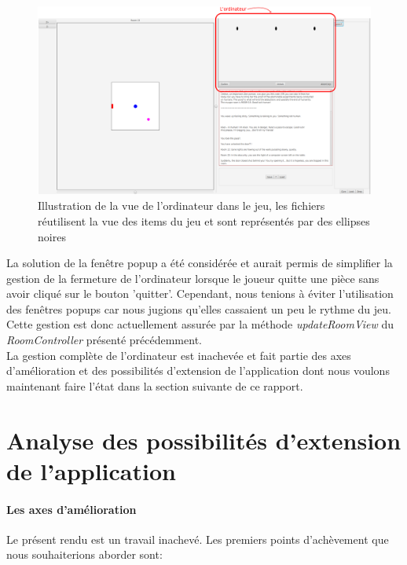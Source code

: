 \documentclass[./standalone.tex]{subfiles}
\begin{document}
\begin{center}
	\begin{figure}[h!]
	\advance\leftskip-0.6cm
	\includegraphics[scale=0.25]{images/ordinateur.png}
	\caption{Illustration de la vue de l'ordinateur dans le jeu, les fichiers réutilisent la vue des items du jeu et sont représentés par des ellipses noires}
	\label{ordinateur}
	\end{figure}
\end{center}

La solution de la fenêtre popup a été considérée et aurait permis de simplifier la gestion de la fermeture de l'ordinateur lorsque le joueur quitte une pièce sans avoir cliqué sur le bouton 'quitter'. Cependant, nous tenions à éviter l'utilisation des fenêtres popups car nous jugions qu'elles cassaient un peu le rythme du jeu.\\

Cette gestion est donc actuellement assurée par la méthode \textit{updateRoomView} du \textit{RoomController} présenté précédemment.\\

La gestion complète de l'ordinateur est inachevée et fait partie des axes d'amélioration et des possibilités d'extension de l'application dont nous voulons maintenant faire l'état dans la section suivante de ce rapport.

\newpage

\section{Analyse des possibilités d’extension de l’application}
\medskip

\paragraph{Les axes d'amélioration\\}
Le présent rendu est un travail inachevé. Les premiers points d'achèvement que nous souhaiterions aborder sont:
\end{document}

